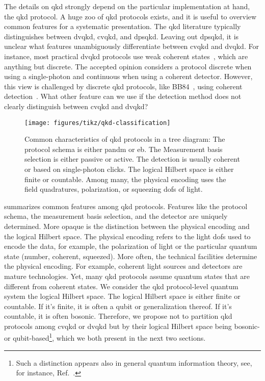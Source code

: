 The details on \gls{qkd} strongly depend on the particular implementation at hand, the \gls{qkd} protocol.
A huge zoo of \gls{qkd} protocols exists, and it is useful to overview common features for a systematic presentation.
The \gls{qkd} literature typically distinguishes between \gls{dvqkd}, \gls{cvqkd}, and \gls{dpsqkd}.
Leaving out \gls{dpsqkd}, it is unclear what features unambiguously differentiate between \gls{cvqkd} and \gls{dvqkd}.
For instance, most practical \gls{dvqkd} protocols use weak coherent states~\cite{Duvsek2006}, which are anything but discrete.
The accepted opinion considers a protocol discrete when using a single-photon and continuous when using a coherent detector.
However, this view is challenged by discrete \gls{qkd} protocols, like BB84~\cite{Bennett1984}, using coherent detection~\cite{Qi2021}.
What other feature can we use if the detection method does not clearly distinguish between \gls{cvqkd} and \gls{dvqkd}?
\begin{figure}[htb]
	\centering
	\texttt{[image: figures/tikz/qkd-classification]}
	\caption{Common characteristics of \gls{qkd} protocols in a tree diagram: The protocol schema is either \gls{pandm} or \gls{eb}. The Measurement basis selection is either passive or active. The detection is usually coherent or based on single-photon clicks. The logical Hilbert space is either finite or countable. Among many, the physical encoding uses the field quadratures, polarization, or squeezing \gls{dof}s of light.}\label{fig:qkd_classification}
\end{figure}
 summarizes common features among \gls{qkd} protocols.
Features like the protocol schema, the measurement basis selection, and the detector are uniquely determined.
More opaque is the distinction between the physical encoding and the logical Hilbert space.
The physical encoding refers to the light \gls{dof}s used to encode the data, for example, the polarization of light or the particular quantum state (number, coherent, squeezed).
More often, the technical facilities determine the physical encoding.
For example, coherent light sources and detectors are mature technologies.
Yet, many \gls{qkd} protocols assume quantum states that are different from coherent states.
We consider the \gls{qkd} protocol-level quantum system the logical Hilbert space.
The logical Hilbert space is either finite or countable.
If it's finite, it is often a qubit or generalization thereof.
If it's countable, it is often bosonic.
Therefore, we propose not to partition \gls{qkd} protocols among \gls{cvqkd} or \gls{dvqkd} but by their logical Hilbert space being bosonic- or qubit-based\footnote{Such a distinction appears also in general quantum information theory, see, for instance, Ref.~\cite[p.~2]{Weedbrook2012}.}, which we both present in the next two sections.